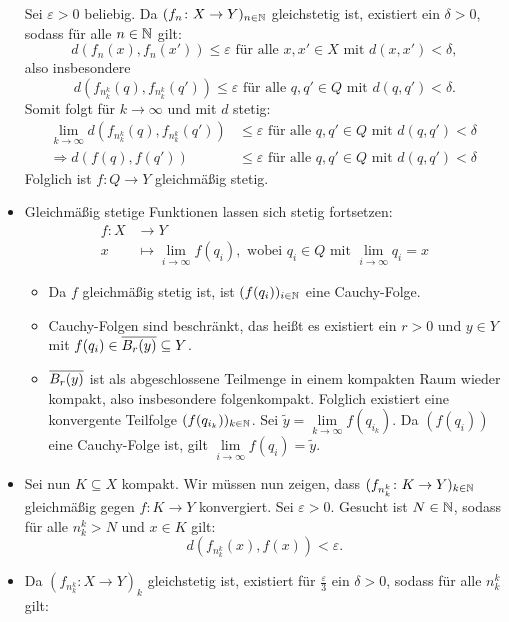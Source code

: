 \begin{beweis}
\begin{itemize}
		Sei $\varepsilon>0$ beliebig.
		Da $(f_n\colon X \rightarrow Y)_{n \in \mathbb{N}}$ gleichstetig ist, existiert ein $\delta > 0$, sodass für alle $n \in \mathbb{N}$ gilt:
		\[
			d(f_n(x),f_n(x')) \leq \varepsilon \text{ für alle } x,x' \in X \text{ mit } d(x,x') < \delta,
		\]
		also insbesondere
		\[
			d(f_{n_k^k}(q),f_{n_k^k}(q')) \leq \varepsilon \text{ für alle } q,q' \in Q \text{ mit } d(q,q') < \delta.
		\]
		Somit folgt für $k \rightarrow \infty$ und mit $d$ stetig:
		\begin{align*}
			\lim\limits_{k \rightarrow \infty} d(f_{n_k^k}(q),f_{n_k^k}(q')) &\leq \varepsilon \text{ für alle } q,q' \in Q \text{ mit } d(q,q') < \delta \\
			\Rightarrow d(f(q),f(q')) &\leq \varepsilon \text{ für alle } q,q' \in Q \text{ mit } d(q,q') < \delta \
		\end{align*}
		Folglich ist $f \colon Q \rightarrow Y$ gleichmäßig stetig.
		\item Gleichmäßig stetige Funktionen lassen sich stetig fortsetzen:
		\begin{align*}
			f \colon X &\longrightarrow Y \\
			x &\longmapsto \lim\limits_{i \rightarrow \infty} f(q_i), \text{ wobei } q_i \in Q \text{ mit } \lim\limits_{i \rightarrow \infty} q_i = x
		\end{align*}
		\begin{itemize}
			\item Da $f$ gleichmäßig stetig ist, ist $(f(q_i))_{i \in \mathbb{N}}$ eine Cauchy-Folge.
			\item Cauchy-Folgen sind beschränkt, das heißt es existiert ein $r > 0$ und $y \in Y$ mit $f(q_i) \in \overline{B_r(y)} \subseteq Y$.
			\item $\overline{B_r(y)}$ ist als abgeschlossene Teilmenge in einem kompakten Raum wieder kompakt, also insbesondere folgenkompakt.
			Folglich existiert eine konvergente Teilfolge $(f(q_{i_k}))_{k \in \mathbb{N}}$.
			Sei $\tilde{y} = \lim\limits_{k \rightarrow \infty} f(q_{i_k})$.
			Da $(f(q_i))$ eine Cauchy-Folge ist, gilt $\lim\limits_{i \rightarrow \infty} f(q_i) = \tilde{y}$.
		\end{itemize}
		\item Sei nun $K \subseteq X$ kompakt.
		Wir müssen nun zeigen, dass $(f_{n_k^k}\colon K \rightarrow Y)_{k \in \mathbb{N}}$ gleichmäßig gegen $f \colon K \rightarrow Y$ konvergiert.
		Sei $\varepsilon > 0$.
		Gesucht ist $N \in \mathbb{N}$, sodass für alle $n_k^k > N$ und $x \in K$ gilt:
		\[
			d(f_{n_k^k}(x),f(x)) < \varepsilon.
		\]
		\item Da $(f_{n_k^k} \colon X \rightarrow Y)_k$ gleichstetig ist, existiert für $\frac{\varepsilon}{3}$ ein $\delta > 0$, sodass für alle $n_k^k$ gilt:

\end{itemize}
\end{beweis}

